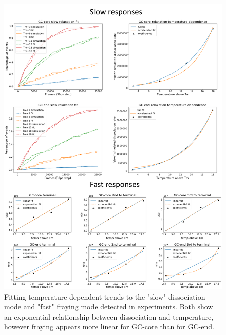 \documentclass[journal=jpcbfk,manuscript=article]{achemso}
\begin{document}
\begin{figure}  %
	\begin{center}
        \includegraphics[width=\textwidth]{Figs/figs_0804/fast-slow_end-core.png}
        \caption{Fitting temperature-dependent trends to the "slow" dissociation mode and "fast" fraying mode detected in experiments. Both show an exponential relationship between dissociation and temperature, however fraying appears more linear for GC-core than for GC-end.}
        \label{fig:relaxation-comparison}
	\end{center}
\end{figure}
\end{document}
